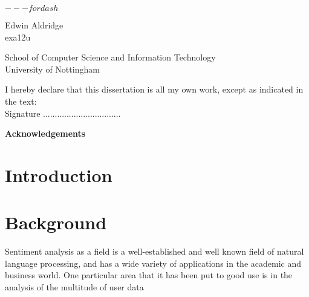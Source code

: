 \documentclass[12pt,twoside]{report}
\begin{document}
\begin{titlepage}
	\begin{center}
		\vspace*{1cm}
		\Huge \textbf{$ --- for dash $\\}
			
		\vspace{1cm}
			
		\Large Edwin Aldridge\\exa12u
			
		\vspace{1cm}
			
		\Large School of Computer Science and Information Technology\\ University of Nottingham
			
		\vspace{1cm}
			
		\normalsize I hereby declare that this dissertation is all my own work, except as indicated in the text:\\
		\vspace{0.25cm}
		\large Signature .................................
	\end{center}
\end{titlepage}
\vspace*{1cm}
\begin{flushright}
	\Large \textbf{Acknowledgements} \vspace{1cm} \normalsize \\
\end{flushright}
\begin{abstract}
\end{abstract}
\tableofcontents
\listoffigures
\chapter{Introduction}
	
\chapter{Background}
	Sentiment analysis as a field is a well-established and well known field of natural language processing, and has a wide variety of applications in the academic and business world. One particular area that it has been put to good use is in the analysis of the multitude of user data 
\end{document}
